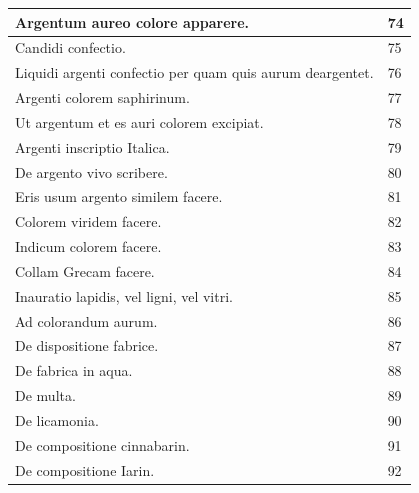 \documentclass[a4paper, 11pt, oneside, polutonikogreek, italian]{article}
\begin{document}
\begin{center}
\begin{longtable}{|p{60mm}|l|}
         Argentum aureo colore apparere.                                                 & 74 \\ \hline
         Candidi confectio.                                                              & 75 \\ \hline
         Liquidi argenti confectio per quam quis aurum deargentet.                       & 76 \\ \hline
         Argenti colorem saphirinum.                                                     & 77 \\ \hline
         Ut argentum et es auri colorem excipiat.                                        & 78 \\ \hline
         Argenti inscriptio Italica.                                                     & 79 \\ \hline
         De argento vivo scribere.                                                       & 80 \\ \hline
         Eris usum argento similem facere.                                               & 81 \\ \hline
         Colorem viridem facere.                                                         & 82 \\ \hline
         Indicum colorem facere.                                                         & 83 \\ \hline
         Collam Grecam facere.                                                           & 84 \\ \hline
         Inauratio lapidis, vel ligni, vel vitri.                                        & 85 \\ \hline
         Ad colorandum aurum.                                                            & 86 \\ \hline
         De dispositione fabrice.                                                        & 87 \\ \hline
         De fabrica in aqua.                                                             & 88 \\ \hline
         De multa.                                                                       & 89 \\ \hline
         De licamonia.                                                                   & 90 \\ \hline
         De compositione cinnabarin.                                                     & 91 \\ \hline
         De compositione Iarin.                                                          & 92 \\ \hline

\end{longtable}
\end{center}
\end{document}
